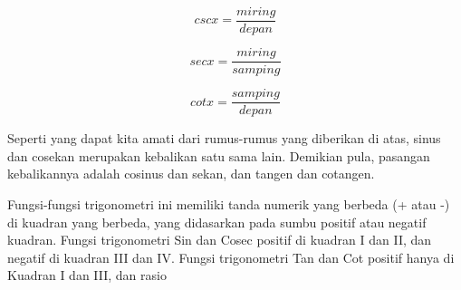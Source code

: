 \documentclass[a4paper,10pt]{article}
\begin{document}
\begin{eulernotebook}
\begin{eulercomment}
\begin{eulercomment}
\begin{eulercomment}
\begin{eulercomment}
\begin{eulercomment}
\begin{eulercomment}
\begin{eulercomment}
\begin{eulercomment}
\begin{eulercomment}
\begin{eulercomment}
\begin{eulercomment}
\begin{eulercomment}
\begin{eulercomment}
\begin{eulercomment}
\begin{eulercomment}
\begin{eulercomment}
\begin{eulercomment}
\begin{eulercomment}
\begin{eulercomment}
\begin{eulercomment}
\begin{eulercomment}
\begin{eulercomment}
\begin{eulercomment}
\begin{eulercomment}
\begin{eulercomment}
\begin{eulercomment}
\begin{eulercomment}
\begin{eulercomment}
\begin{eulercomment}
\begin{eulercomment}
\begin{eulercomment}
\begin{eulercomment}
\begin{eulercomment}
\begin{eulercomment}
\begin{eulercomment}
\begin{eulercomment}
\begin{eulercomment}
\begin{eulercomment}
\begin{eulercomment}
\begin{eulercomment}
\begin{eulercomment}
\begin{eulercomment}
\begin{eulercomment}
\begin{eulercomment}
\begin{eulercomment}
\begin{eulercomment}
\begin{eulercomment}
\begin{eulercomment}
\begin{eulerformula}
\end{eulerformula}
\begin{eulerformula}
\[
csc x = \frac{miring}{depan}
\]
\end{eulerformula}
\begin{eulerformula}
\[
sec x = \frac{miring}{samping}
\]
\end{eulerformula}
\begin{eulerformula}
\[
cot x = \frac{samping}{depan}
\]
\end{eulerformula}
\begin{eulercomment}
Seperti yang dapat kita amati dari rumus-rumus yang diberikan di atas,
sinus dan cosekan merupakan kebalikan satu sama lain. Demikian pula,
pasangan kebalikannya adalah cosinus dan sekan, dan tangen dan
cotangen.


\end{eulercomment}
\begin{eulercomment}
Fungsi-fungsi trigonometri ini memiliki tanda numerik yang berbeda (+
atau -) di kuadran yang berbeda, yang didasarkan pada sumbu positif
atau negatif kuadran. Fungsi trigonometri Sin dan Cosec positif di
kuadran I dan II, dan negatif di kuadran III dan IV. Fungsi
trigonometri Tan dan Cot positif hanya di Kuadran I dan III, dan rasio

\end{eulercomment}
\end{eulercomment}
\end{eulercomment}
\end{eulercomment}
\end{eulercomment}
\end{eulercomment}
\end{eulercomment}
\end{eulercomment}
\end{eulercomment}
\end{eulercomment}
\end{eulercomment}
\end{eulercomment}
\end{eulercomment}
\end{eulercomment}
\end{eulercomment}
\end{eulercomment}
\end{eulercomment}
\end{eulercomment}
\end{eulercomment}
\end{eulercomment}
\end{eulercomment}
\end{eulercomment}
\end{eulercomment}
\end{eulercomment}
\end{eulercomment}
\end{eulercomment}
\end{eulercomment}
\end{eulercomment}
\end{eulercomment}
\end{eulercomment}
\end{eulercomment}
\end{eulercomment}
\end{eulercomment}
\end{eulercomment}
\end{eulercomment}
\end{eulercomment}
\end{eulercomment}
\end{eulercomment}
\end{eulercomment}
\end{eulercomment}
\end{eulercomment}
\end{eulercomment}
\end{eulercomment}
\end{eulercomment}
\end{eulercomment}
\end{eulercomment}
\end{eulercomment}
\end{eulercomment}
\end{eulercomment}
\end{eulernotebook}
\end{document}
